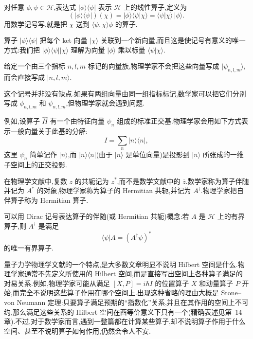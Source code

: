 \begin{definition}[记号 3.28:秩一算子]\label{def:rank-one-dirac}
对任意 \(\phi,\psi\in\mathcal{H}\),表达式 \(\lvert\phi\rangle\langle\psi\rvert\) 表示 \(\mathcal{H}\) 上的线性算子,定义为
\[
(\lvert\phi\rangle\langle\psi\rvert)(\chi)
=\lvert\phi\rangle\langle\psi\vert\chi\rangle
=\langle\psi\vert\chi\rangle\,\lvert\phi\rangle.
\]
用数学记号写,就是把 \(\chi\) 送到 \(\langle\psi,\chi\rangle\phi\) 的算子.
\end{definition}

算子 \(\lvert\phi\rangle\langle\psi\rvert\) 把每个 ket 向量 \(\lvert\chi\rangle\) 关联到一个新向量,而且这是使记号有意义的唯一方式:我们把 \(\lvert\phi\rangle\langle\psi\vert\lvert\chi\rangle\) 理解为向量 \(\lvert\phi\rangle\) 乘以标量 \(\langle\psi\vert\chi\rangle\).

\begin{definition}[记号 3.29:指标记号]\label{def:dirac-index-notation}
给定一个由三个指标 \(n,l,m\) 标记的向量族,物理学家不会把这些向量写成 \(\lvert\psi_{n,l,m}\rangle\),而会直接写成 \(\lvert n,l,m\rangle\).
\end{definition}

这个记号并非没有缺点.如果有两组向量由同一组指标标记,数学家可以把它们分别写成 \(\phi_{n,l,m}\) 和 \(\psi_{n,l,m}\),但物理学家就会遇到问题.

例如,设算子 \(\widehat H\) 有一个由特征向量 \(\psi_{n}\) 组成的标准正交基.物理学家会用如下方式表示一般向量关于此基的分解:
\begin{equation}
I=\sum_{n}\lvert n\rangle\langle n\rvert,
\label{eq:dirac-resolution-identity}
\end{equation}
这里 \(\psi_{n}\) 简单记作 \(\lvert n\rangle\),而 \(\lvert n\rangle\langle n\rvert\)(由于 \(\lvert n\rangle\) 是单位向量)是投影到 \(\lvert n\rangle\) 所张成的一维子空间上的正交投影.

\begin{definition}[记号 3.30:物理学中的伴随]\label{def:physics-adjoint}
在物理学文献中,复数 \(z\) 的共轭记为 \(z^{*}\),而不是数学文献中的 \(\overline z\).数学家称为算子伴随并记为 \(A^{*}\) 的对象,物理学家称为算子的 Hermitian 共轭,并记为 \(A^{\dagger}\).物理学家把自伴算子称为 Hermitian 算子.
\end{definition}

可以用 Dirac 记号表达算子的伴随(或 Hermitian 共轭)概念:若 \(A\) 是 \(\mathcal{H}\) 上的有界算子,则 \(A^{\dagger}\) 是满足
\[
\langle\psi\vert A=(A^{\dagger}\psi)^{*}
\]
的唯一有界算子.

量子力学物理学文献的一个特点,是大多数文章明显不说明 Hilbert 空间是什么.物理学家通常不先定义所使用的 Hilbert 空间,而是直接写出空间上各种算子满足的对易关系.例如,物理学家可能从满足 \([X,P]=i\hbar I\) 的位置算子 \(X\) 和动量算子 \(P\) 开始,而完全不说明这些算子作用在哪个空间上.出现这种省略的理由大概是 Stone--von Neumann 定理:只要算子满足预期的“指数化”关系,并且在其作用的空间上不可约,那么满足这些关系的 Hilbert 空间在酉等价意义下只有一个(精确表述见第~14 章).不过,对于数学家而言,遇到一整篇都在计算某些算子,却不说明算子作用于什么空间、甚至不说明算子如何作用,仍然会令人不安.

